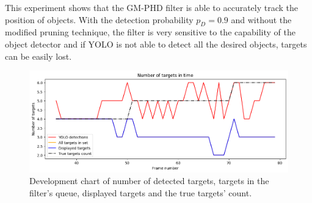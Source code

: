 This experiment shows that the GM-PHD filter is able to accurately track the position of objects. With the detection
probability $p_D = 0.9$ and without the modified pruning technique, the filter is very sensitive to the capability of
the
object detector and if YOLO is not able to detect all the desired objects, targets can be easily lost.

\begin{figure}[H]
    \centering
    \includegraphics[width=\linewidth]{../../../experiments/E1/V1/noPd/staticPd_det}
    \caption{Development chart of number of detected targets, targets in the filter's queue, displayed targets and
    the true
    targets' count.}
    \label{gr:E1-V1-S0}
\end{figure}

